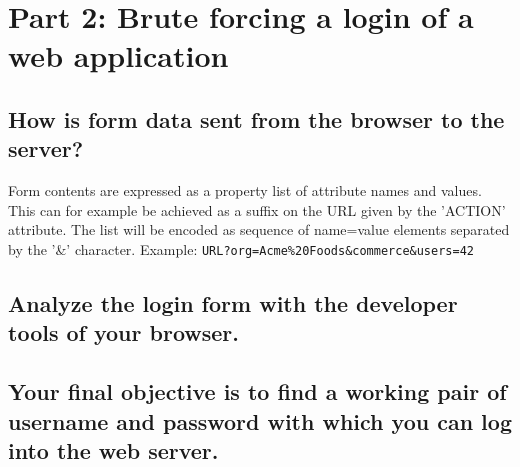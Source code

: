 \section{Part 2: Brute forcing a login of a web application}

\subsection{How is form data sent from the browser to the server?}

Form contents are expressed as a property list of attribute names and values. This can for example be achieved as a suffix on the URL given by the 'ACTION' attribute. The list will be encoded as sequence of name=value elements separated by the '\&' character. Example: \verb|URL?org=Acme%20Foods&commerce&users=42|



\subsection{Analyze the login form with the developer tools of your browser.}

\subsection{Your final objective is to find a working pair of username and password with which you can log into the web server.}